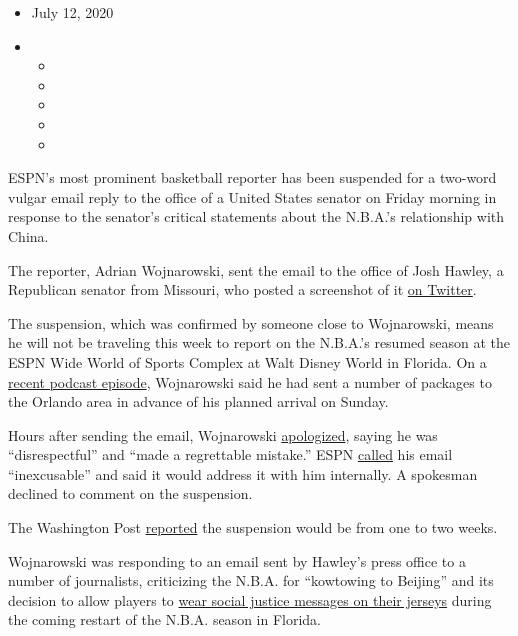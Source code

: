 \begin{itemize}
\item
  July 12, 2020
\item
  \begin{itemize}
  \item
  \item
  \item
  \item
  \item
  \end{itemize}
\end{itemize}

ESPN's most prominent basketball reporter has been suspended for a
two-word vulgar email reply to the office of a United States senator on
Friday morning in response to the senator's critical statements about
the N.B.A.'s relationship with China.

The reporter, Adrian Wojnarowski, sent the email to the office of Josh
Hawley, a Republican senator from Missouri, who posted a screenshot of
it \href{https://twitter.com/HawleyMO/status/1281604989593559040}{on
Twitter}.

The suspension, which was confirmed by someone close to Wojnarowski,
means he will not be traveling this week to report on the N.B.A.'s
resumed season at the ESPN Wide World of Sports Complex at Walt Disney
World in Florida. On a
\href{http://www.espn.com/espnradio/play?id=29399672}{recent podcast
episode}, Wojnarowski said he had sent a number of packages to the
Orlando area in advance of his planned arrival on Sunday.

Hours after sending the email, Wojnarowski
\href{https://twitter.com/wojespn/status/1281650976319868930}{apologized},
saying he was ``disrespectful'' and ``made a regrettable mistake.'' ESPN
\href{https://twitter.com/ESPNPR/status/1281651168406654978}{called} his
email ``inexcusable'' and said it would address it with him internally.
A spokesman declined to comment on the suspension.

The Washington Post
\href{https://www.washingtonpost.com/sports/2020/07/12/adrian-wojnarowski-suspended-espn-email-senator-josh-hawley/}{reported}
the suspension would be from one to two weeks.

Wojnarowski was responding to an email sent by Hawley's press office to
a number of journalists, criticizing the N.B.A. for ``kowtowing to
Beijing'' and its decision to allow players to
\href{https://www.espn.com/nba/story/_/id/29430249/equality-tops-list-nba-players-most-popular-social-justice-jersey-messages}{wear
social justice messages on their jerseys} during the coming restart of
the N.B.A. season in Florida.


